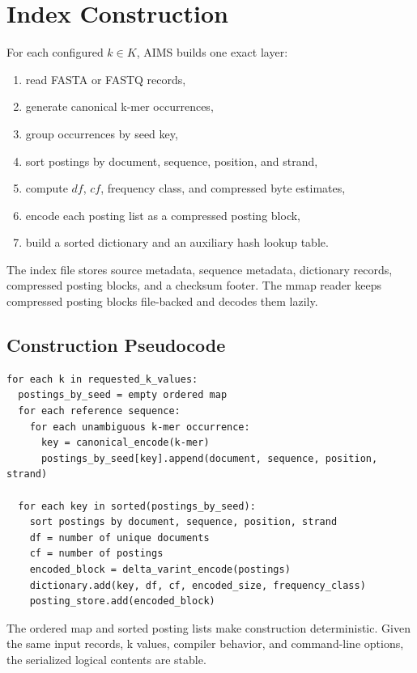 \documentclass[11pt]{article}
\begin{document}
\section{Index Construction}

For each configured \(k \in K\), AIMS builds one exact layer:
\begin{enumerate}
  \item read FASTA or FASTQ records,
  \item generate canonical k-mer occurrences,
  \item group occurrences by seed key,
  \item sort postings by document, sequence, position, and strand,
  \item compute \(df\), \(cf\), frequency class, and compressed byte estimates,
  \item encode each posting list as a compressed posting block,
  \item build a sorted dictionary and an auxiliary hash lookup table.
\end{enumerate}

The index file stores source metadata, sequence metadata, dictionary records, compressed posting blocks, and a checksum footer. The mmap reader keeps compressed posting blocks file-backed and decodes them lazily.

\subsection{Construction Pseudocode}

\begin{verbatim}
for each k in requested_k_values:
  postings_by_seed = empty ordered map
  for each reference sequence:
    for each unambiguous k-mer occurrence:
      key = canonical_encode(k-mer)
      postings_by_seed[key].append(document, sequence, position, strand)

  for each key in sorted(postings_by_seed):
    sort postings by document, sequence, position, strand
    df = number of unique documents
    cf = number of postings
    encoded_block = delta_varint_encode(postings)
    dictionary.add(key, df, cf, encoded_size, frequency_class)
    posting_store.add(encoded_block)
\end{verbatim}

The ordered map and sorted posting lists make construction deterministic. Given the same input records, k values, compiler behavior, and command-line options, the serialized logical contents are stable.
\end{document}
